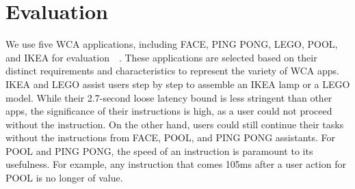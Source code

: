 \section{Evaluation}

We use five WCA applications, including FACE, PING PONG, LEGO, POOL, and IKEA
for evaluation~\cite{chen2017empirical}~\cite{chen2018application}. These
applications are selected based on their distinct requirements and
characteristics to represent the variety of WCA apps. IKEA and LEGO assist users
step by step to assemble an IKEA lamp or a LEGO model. While their 2.7-second
loose latency bound is less stringent than other apps, the significance of their
instructions is high, as a user could not proceed without the instruction. On
the other hand, users could still continue their tasks without the instructions
from FACE, POOL, and PING PONG assistants. For POOL and PING PONG, the speed of
an instruction is paramount to its usefulness. For example, any instruction that
comes 105ms after a user action for POOL is no longer of value.

